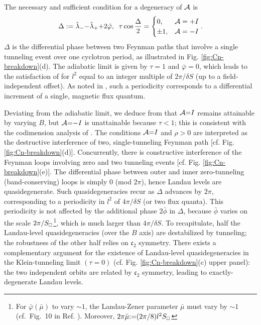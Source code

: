 \documentclass[aps, showpacs, twocolumn, notitlepage, superscriptaddress]{revtex4-1}
\begin{document}
The necessary and sufficient condition for a degeneracy of ${\cal A}$ is 
\begin{align}
\Delta:= \tilde{\lambda}_-{-}\tilde{\lambda}_{+}{+}2\bar{\varphi},\;\;
\tau\cos\frac{\Delta}{2}= \begin{cases} 0, & {{\cal A}}=+I \\
                 \pm 1, & {\cal A} =-I\end{cases}.\label{c2breakdowndgncondition}
\end{align}
$\Delta$ is the differential phase between two Feynman paths  that involve a single tunneling event  over one cyclotron period, as illustrated in Fig. \ref{fig:Cn-breakdown}(d).
The adiabatic limit is given by $\tau{=}1$ and $\bar{\varphi}{=}0$, which leads to the satisfaction of  for $l^2$ equal to an integer multiple of $2\pi/\delta S$ (up to a field-independent offset). As noted in , such a periodicity corresponds to a differential increment of a single, magnetic flux quantum. 

Deviating from the adiabatic limit, we deduce from  that ${\cal A}{=}I$ remains attainable by varying $B$, but ${\cal A}{=}{-}I$ is unattainable because $\tau{<}1$; this is consistent with the codimension analysis of . The conditions ${\cal A}{=}I$ and $\rho{>}0$ are interpreted as the destructive interference of  two, single-tunneling Feynman path [cf. Fig. \ref{fig:Cn-breakdown}(d)]. Concurrently, there is constructive interference of the Feynman loops involving zero and two tunneling events [cf. Fig. \ref{fig:Cn-breakdown}(e)]. The differential phase between outer and inner zero-tunneling (band-conserving) loops is simply 0 (mod $2\pi$), hence Landau levels are quasidegenerate. Such quasidegeneracies recur as $\Delta$ advances by $2\pi$, corresponding to a periodicity in $l^2$ of $4\pi/\delta S$ (or two flux quanta). This periodicity is not affected by the additional phase $2\bar{\phi}$ in $\Delta$, because $\bar{\phi}$ varies on the scale  $2\pi/S_{\scriptscriptstyle{\square}}$\footnote{For $\bar{\varphi}(\bar{\mu})$ to vary $\sim 1$, the Landau-Zener parameter $\bar{\mu}$ must vary by $\sim 1$ (cf.\  Fig.\ 10 in Ref. ). Moreover, $2\pi\bar{\mu}{:}{=} (2\pi/8) l^2S_{\scriptscriptstyle{\square}}$\cite{AALG}}, which is much larger than $4\pi/\delta S$. To recapitulate, half the Landau-level quasidegeneracies (over the $B$ axis) are destabilized  by tunneling; the robustness of the other half relies on $\mathfrak{c}_2$ symmetry. There exists a complementary argument for the existence of Landau-level quasidegeneracies in the Klein-tunneling limit $(\tau{=}0)$ (cf. Fig. \ref{fig:Cn-breakdown}(c) upper panel): the two independent orbits are related by $\mathfrak{c}_2$ symmetry, leading to exactly-degenerate Landau levels.  
\end{document}
